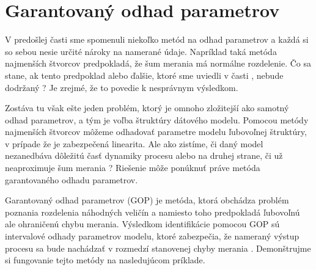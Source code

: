 \chapter{Garantovaný odhad parametrov}
V predošlej časti sme spomenuli niekoľko metód na odhad parametrov a každá si so sebou nesie určité nároky na namerané údaje. Napríklad taká metóda najmenších štvorcov predpokladá, že šum merania má normálne rozdelenie. Čo sa stane, ak tento predpoklad alebo ďalšie, ktoré sme uviedli v časti , nebude dodržaný ? Je zrejmé, že to povedie k nesprávnym výsledkom. 

Zostáva tu však ešte jeden problém, ktorý je omnoho zložitejší ako samotný odhad parametrov, a tým je voľba štruktúry dátového modelu. Pomocou metódy najmenších štvorcov môžeme odhadovať parametre modelu ľubovoľnej štruktúry, v prípade že je zabezpečená linearita. Ale ako zistíme, či daný model nezanedbáva dôležitú časť dynamiky procesu alebo na druhej strane, či už neaproximuje šum merania ? Riešenie môže ponúknuť práve metóda garantovaného odhadu parametrov.

Garantovaný odhad parametrov (GOP) je metóda, ktorá obchádza problém poznania rozdelenia náhodných veličín a namiesto toho predpokladá ľubovoľnú ale ohraničenú chybu merania. Výsledkom identifikácie pomocou GOP sú intervalové odhady parametrov modelu, ktoré zabezpečia, že nameraný výstup procesu sa bude nachádzať v rozmedzí stanovenej chyby merania \cite{paulen:gpe:2017}. Demonštrujme si fungovanie tejto metódy na nasledujúcom príklade.

